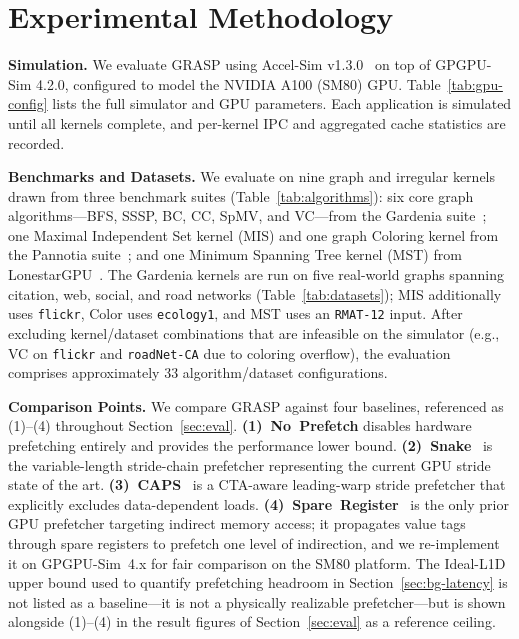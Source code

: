 \documentclass[sigconf, screen, review]{acmart}
\begin{document}


\section{Experimental Methodology}
\label{sec:method}

\noindent\textbf{Simulation.}\hspace{0.5em}
We evaluate GRASP using Accel-Sim v1.3.0~\cite{khairy2020accelsim}
on top of GPGPU-Sim 4.2.0, configured to model the NVIDIA A100
(SM80) GPU. Table~\ref{tab:gpu-config} lists the full simulator
and GPU parameters. Each application is simulated until all
kernels complete, and per-kernel IPC and aggregated cache
statistics are recorded.

\smallskip
\noindent\textbf{Benchmarks and Datasets.}\hspace{0.5em}
We evaluate on nine graph and irregular kernels drawn from three
benchmark suites (Table~\ref{tab:algorithms}): six core graph
algorithms---BFS, SSSP, BC, CC, SpMV, and VC---from the Gardenia
suite~\cite{xu2019gardenia}; one Maximal Independent Set kernel
(MIS) and one graph Coloring kernel from the Pannotia
suite~\cite{che2013pannotia}; and one Minimum Spanning Tree kernel
(MST) from LonestarGPU~\cite{burtscher2012irregular}. The Gardenia
kernels are run on five real-world graphs spanning citation, web,
social, and road networks (Table~\ref{tab:datasets}); MIS additionally
uses \texttt{flickr}, Color uses \texttt{ecology1}, and MST uses an
\texttt{RMAT-12} input. After excluding kernel/dataset combinations
that are infeasible on the simulator (e.g., VC on \texttt{flickr}
and \texttt{roadNet-CA} due to coloring overflow), the evaluation
comprises approximately 33 algorithm/dataset configurations.

\smallskip
\noindent\textbf{Comparison Points.}\hspace{0.5em}
We compare GRASP against four baselines, referenced as (1)--(4)
throughout Section~\ref{sec:eval}.
\textbf{(1)~No~Prefetch} disables hardware prefetching entirely and
provides the performance lower bound.
\textbf{(2)~Snake}~\cite{mostofi2023snake} is the variable-length
stride-chain prefetcher representing the current GPU stride state of
the art.
\textbf{(3)~CAPS}~\cite{koo2018caps} is a CTA-aware leading-warp
stride prefetcher that explicitly excludes data-dependent loads.
\textbf{(4)~Spare~Register}~\cite{lakshminarayana2014spare} is the
only prior GPU prefetcher targeting indirect memory access; it
propagates value tags through spare registers to prefetch one level
of indirection, and we re-implement it on GPGPU-Sim~4.x for fair
comparison on the SM80 platform. The Ideal-L1D upper bound used to
quantify prefetching headroom in Section~\ref{sec:bg-latency} is not
listed as a baseline---it is not a physically realizable
prefetcher---but is shown alongside (1)--(4) in the result figures
of Section~\ref{sec:eval} as a reference ceiling.
\end{document}
